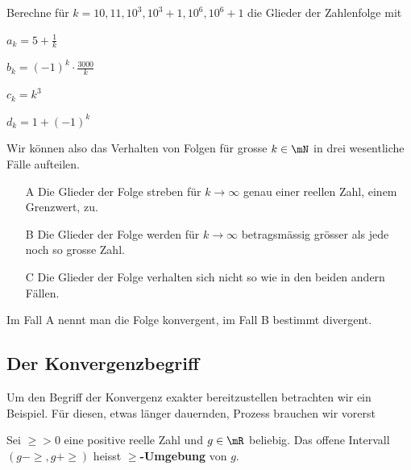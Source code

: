 \documentclass[%
11pt,%
twoside,%
titlepage,%
german,%
headsepline%
]{scrartcl}
\begin{document}
\begin{ueb}
Berechne f\"ur $k=10,11,10^3,10^3+1,10^6,10^6+1$ die Glieder der Zahlenfolge mit

\begin{minipage}{0.3\textwidth}
\begin{enumeratea}
\item $a_k=5+\frac{1}{k}$
\item $b_k=(-1)^k\cdot\frac{3000}{k}$
\end{enumeratea}
\end{minipage}
\begin{minipage}{3.9cm}
\begin{enumeratea}
\addtocounter{enumi}{2}
\item $c_k=k^3$
\item $d_k=1+(-1)^k$
\end{enumeratea}
\end{minipage}
\end{ueb}

Wir k\"onnen also das Verhalten von Folgen f\"ur grosse $k\in\mN$ in drei wesentliche F\"alle aufteilen.
\begin{itemize}
\item[A] Die Glieder der Folge streben f\"ur $k\to\infty$ genau einer reellen Zahl, einem Grenzwert, zu.
\item[B] Die Glieder der Folge werden f\"ur $k\to\infty$ betragsm\"assig gr\"osser als jede noch so grosse Zahl.
\item[C] Die Glieder der Folge verhalten sich nicht so wie in den beiden andern F\"allen.
\end{itemize}
Im Fall A nennt man die Folge konvergent, im Fall B bestimmt divergent.

\subsection{Der Konvergenzbegriff}

Um den Begriff der Konvergenz exakter bereitzustellen betrachten wir ein Beispiel. F\"ur diesen, etwas l\"anger dauernden, Prozess brauchen wir vorerst

\begin{cdef}[Umgebung]{}
Sei $\ge>0$ eine positive reelle Zahl und $g\in\mR$ beliebig. Das offene Intervall $(g-\ge,g+\ge)$ heisst \textbf{$\ge$-Umgebung} von $g$.
\end{cdef}
\end{document}
